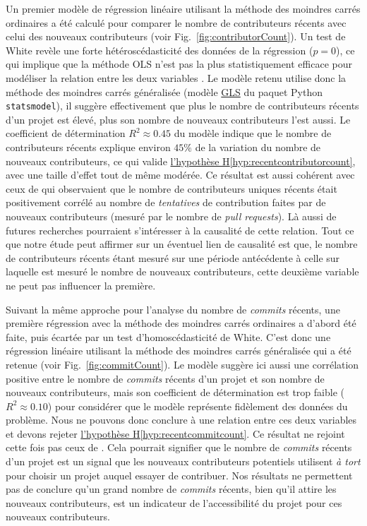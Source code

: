 \documentclass[dvipsnames,runningheads]{llncs}
\newcommand{\en}[1]{\foreignlanguage{english}{\emph{#1}}}
\begin{document}
    Un premier modèle de régression linéaire utilisant la méthode des moindres carrés ordinaires a été calculé
    pour comparer le nombre de contributeurs récents avec celui des nouveaux contributeurs (voir
    Fig.~\ref{fig:contributorCount}). Un test de White revèle une forte hétéroscédasticité des données de la
    régression ($p = 0$), ce qui implique que la méthode OLS n'est pas la plus statistiquement efficace pour
    modéliser la relation entre les deux variables \parencite{GLS-2021}. Le modèle retenu utilise donc la
    méthode des moindres carrés généralisée (modèle
    \href{https://www.statsmodels.org/dev/generated/statsmodels.regression.linear_model.GLS.html}{GLS} du
    paquet Python \texttt{statsmodel}), il suggère effectivement que plus le nombre de contributeurs récents
    d'un projet est élevé, plus son nombre de nouveaux contributeurs l'est aussi. Le coefficient de
    détermination $R^2 \approx 0.45$ du modèle indique que le nombre de contributeurs récents explique environ
    $45\%$ de la variation du nombre de nouveaux contributeurs, ce qui valide
    \hyperref[hyp:recentcontributorcount]{l'hypothèse H\ref*{hyp:recentcontributorcount}}, avec une taille
    d'effet tout de même modérée. Ce résultat est aussi cohérent avec ceux de
    \textcite[p.~12-13,16]{signals-2019} qui observaient que le nombre de contributeurs uniques récents était
    positivement corrélé au nombre de \emph{tentatives} de contribution faites par de nouveaux contributeurs
    (mesuré par le nombre de \en{pull requests}). Là aussi de futures recherches pourraient s'intéresser à la
    causalité de cette relation. Tout ce que notre étude peut affirmer sur un éventuel lien de causalité est
    que, le nombre de contributeurs récents étant mesuré sur une période antécédente à celle sur laquelle est
    mesuré le nombre de nouveaux contributeurs, cette deuxième variable ne peut pas influencer la première.

    Suivant la même approche pour l'analyse du nombre de \en{commits} récents, une première régression avec la
    méthode des moindres carrés ordinaires a d'abord été faite, puis écartée par un test d'homoscédasticité de
    White. C'est donc une régression linéaire utilisant la méthode des moindres carrés généralisée qui a été
    retenue (voir Fig.~\ref{fig:commitCount}). Le modèle suggère ici aussi une corrélation positive entre le
    nombre de \en{commits} récents d'un projet et son nombre de nouveaux contributeurs, mais son coefficient
    de détermination est trop faible ($R^2 \approx 0.10$) pour considérer que le modèle représente fidèlement
    des données du problème. Nous ne pouvons donc conclure à une relation entre ces deux variables et devons
    rejeter \hyperref[hyp:recentcommitcount]{l'hypothèse H\ref*{hyp:recentcommitcount}}. Ce résultat ne
    rejoint cette fois pas ceux de \textcite[p.~13,16]{signals-2019}. Cela pourrait signifier que le nombre de
    \en{commits} récents d'un projet est un signal que les nouveaux contributeurs potentiels utilisent \emph{à
    tort} pour choisir un projet auquel essayer de contribuer. Nos résultats ne permettent pas de conclure
    qu'un grand nombre de \en{commits} récents, bien qu'il attire les nouveaux contributeurs, est un
    indicateur de l'accessibilité du projet pour ces nouveaux contributeurs.
\end{document}
